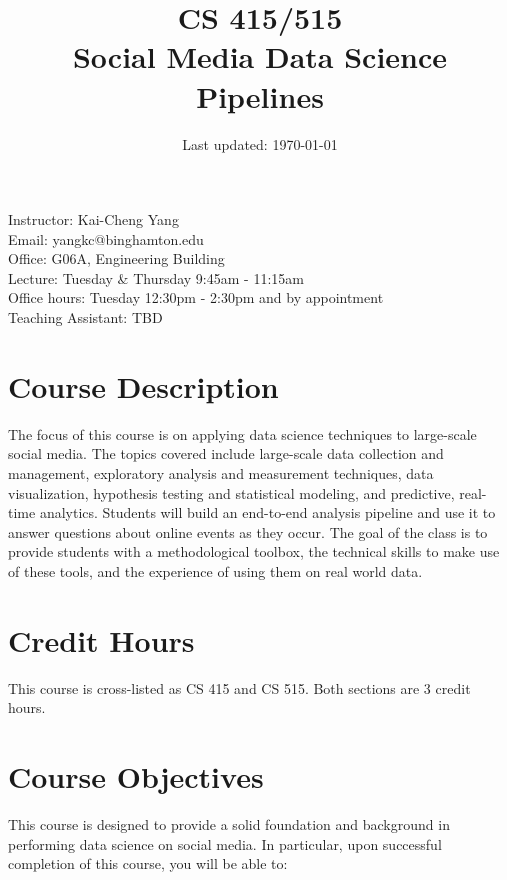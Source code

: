 \documentclass[11pt,article,oneside]{memoir} %
\makeatletter
\def\myauthor{Author}
\def\mytitle{Title}
\def\myemail{yangkc@binghamton.edu}
\def\myauthor{Kai-Cheng Yang}
\def\mytitle{{\normalsize CS 415/515} \\ \HUGE{} Social Media Data Science Pipelines}
\makeatother
\begin{document}

\title{\LARGE \mytitle} %
\date{Last updated: \today}


\maketitle

Instructor: \myauthor \\
Email: \myemail\\
Office: G06A, Engineering Building \\
Lecture: Tuesday \& Thursday 9:45am - 11:15am \\
Office hours: Tuesday 12:30pm - 2:30pm and by appointment \\

Teaching Assistant: TBD \\

\section{Course Description}%

The focus of this course is on applying data science techniques to large-scale social media.
The topics covered include large-scale data collection and management, exploratory analysis and measurement techniques, data visualization, hypothesis testing and statistical modeling, and predictive, real-time analytics.
Students will build an end-to-end analysis pipeline and use it to answer questions about online events as they occur.
The goal of the class is to provide students with a methodological toolbox, the technical skills to make use of these tools, and the experience of using them on real world data.


\section{Credit Hours}

This course is cross-listed as CS 415 and CS 515.
Both sections are 3 credit hours.

\section{Course Objectives}%

This course is designed to provide a solid foundation and background in performing data science on social media.
In particular, upon successful completion of this course, you will be able to:
\end{document}
